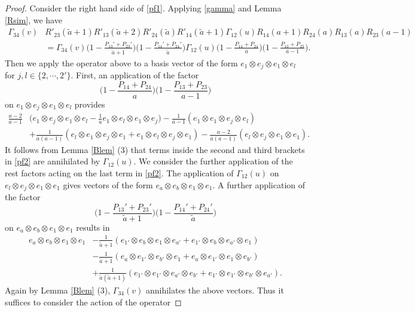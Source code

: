 \documentclass[11pt,reqno]{amsart}
\numberwithin{equation}{section}
\theoremstyle{definition}
\theoremstyle{remark}
\newcommand{\beq}{\begin{equation}}
\newcommand{\eeq}{\end{equation}}
\newcommand{\tl}{\tilde}
\begin{document}
\begin{proof}
Consider the right hand side of \eqref{pf1}. Applying \eqref{gamma} and Lemma \ref{Rsim}, we have
\begin{align*}
\Gamma_{34}(v)&R'_{23}(\tl a+1)R'_{13}(\tl a+2)R'_{24}(\tl a)R'_{14}(\tl a+1)\Gamma_{12}(u)R_{14}(a+1)R_{24}(a)R_{13}(a)R_{23}(a-1)\\
&=\Gamma_{34}(v)\Big(1-\frac{P_{13}'+P_{23}'}{\tl a+1}\Big)\Big(1-\frac{P_{14}'+P_{24}'}{\tl a}\Big)\Gamma_{12}(u)\Big(1-\frac{P_{14}+P_{24}}{a}\Big)\Big(1-\frac{P_{13}+P_{23}}{a-1}\Big).
\end{align*}
Then we apply the operator above to a basis vector of the form $e_1\otimes e_j\otimes e_1\otimes e_l$ for $j,l\in\{2,\cdots,2'\}$. First, an application of the factor
\[
\Big(1-\frac{P_{14}+P_{24}}{a}\Big)\Big(1-\frac{P_{13}+P_{23}}{a-1}\Big)
\]
on $e_1\otimes e_j\otimes e_1\otimes e_l$ provides
\beq\label{pf2}
\begin{split}
\frac{a-2}{a-1}&\Big(e_1\otimes e_j\otimes e_1\otimes e_l  -\frac{1}{a}e_1\otimes e_l\otimes e_1\otimes e_j\Big)- \frac{1}{a-1}(e_{1}\otimes e_1\otimes e_j\otimes e_l) \\
&+ \frac{1}{a(a-1)}(e_l\otimes e_1\otimes e_j\otimes e_1+e_1\otimes e_l\otimes e_j\otimes e_1) - \frac{a-2}{a(a-1)}(e_l\otimes e_j\otimes e_1\otimes e_1).
\end{split}
\eeq
It follows from Lemma \ref{Blem} (3) that terms inside the second and third brackets in \eqref{pf2} are annihilated by $\Gamma_{12}(u)$. We consider the further application of the rest factors acting on the last term in \eqref{pf2}. The application of $\Gamma_{12}(u)$ on $e_l\otimes e_j\otimes e_1\otimes e_1$ gives vectors of the form $e_a\otimes e_b\otimes e_1\otimes e_1$. A further application of the factor
\beq\label{pf3}
\Big(1-\frac{P_{13}'+P_{23}'}{\tl a+1}\Big)\Big(1-\frac{P_{14}'+P_{24}'}{\tl a}\Big)
\eeq
on $e_a\otimes e_b\otimes e_1\otimes e_1$ results in
\begin{align*}
e_a\otimes e_b\otimes e_1\otimes e_1&-\frac{1}{\tl a+1}(e_{1'}\otimes e_b\otimes e_1\otimes e_{a'}+e_{1'}\otimes e_b\otimes e_{a'}\otimes e_{1})\\
&-\frac{1}{\tl a+1}(e_a\otimes e_{1'}\otimes e_{b'}\otimes e_{1}+e_a\otimes e_{1'}\otimes e_1\otimes e_{b'})\\
&+\frac{1}{\tl a(\tl a+1)}(e_{1'}\otimes e_{1'}\otimes e_{a'}\otimes e_{b'}+e_{1'}\otimes e_{1'}\otimes e_{b'}\otimes e_{a'}).
\end{align*}
Again by Lemma \ref{Blem} (3), $\Gamma_{34}(v)$ annihilates the above vectors. Thus it suffices to consider the action of the operator 

\end{proof}
\end{document}
